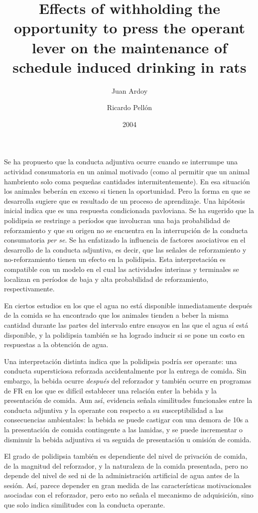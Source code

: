 \documentclass[a4paper,12pt]{article}
\title{Effects of withholding the opportunity to press the operant lever on the maintenance of schedule induced drinking in rats}
\author{Juan Ardoy \and Ricardo Pellón}
\date{2004}
\begin{document}
{\scshape\bfseries \maketitle}

Se ha propuesto que la conducta adjuntiva ocurre cuando se interrumpe una actividad consumatoria en un animal motivado (como al permitir que un animal hambriento solo coma pequeñas cantidades intermitentemente). En esa situación los animales beberán en exceso si tienen la oportunidad. Pero la forma en que se desarrolla sugiere que es resultado de un proceso de aprendizaje. Una hipótesis inicial indica que es una respuesta condicionada pavloviana. Se ha sugerido que la polidipsia se restringe a períodos que involucran una baja probabilidad de reforzamiento y que su origen no se encuentra en la interrupción de la conducta consumatoria {\itshape per se}. Se ha enfatizado la influencia de factores asociativos en el desarrollo de la conducta adjuntiva, es decir, que las señales de reforzamiento y no-reforzamiento tienen un efecto en la polidipsia. Esta interpretación es compatible con un modelo en el cual las actividades interinas y terminales se localizan en períodos de baja y alta probabilidad de reforzamiento, respectivamente. 

En ciertos estudios en los que el agua no está disponible inmediatamente después de la comida se ha encontrado que los animales tienden a beber la misma cantidad durante las partes del intervalo entre ensayos en las que el agua sí está disponible, y la polidipsia también se ha logrado inducir si se pone un costo en respuestas a la obtención de agua.

Una interpretación distinta indica que la polidipsia podría ser operante: una conducta supersticiosa reforzada accidentalmente por la entrega de comida. Sin embargo, la bebida ocurre {\itshape después} del reforzador y también ocurre en programas de FR en los que es difícil establecer una relación enter la bebida y la presentación de comida. Aun así, evidencia señala similitudes funcionales entre la conducta adjuntiva y la operante con respecto a su susceptibilidad a las consecuencias ambientales: la bebida se puede castigar con una demora de 10s a la presentación de comida contingente a las lamidas, y se puede incrementar o disminuir la bebida adjuntiva si va seguida de presentación u omisión de comida.

El grado de polidipsia también es dependiente del nivel de privación de comida, de la magnitud del reforzador, y la naturaleza de la comida presentada, pero no depende del nivel de sed ni de la administración artificial de agua antes de la sesión. Así, parece depender en gran medida de las características motivacionales asociadas con el reforzador, pero esto no señala el mecanismo de adquisición, sino que solo indica similitudes con la conducta operante.
\end{document}
